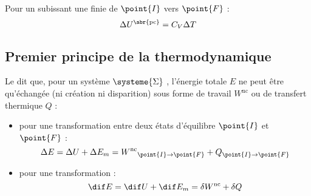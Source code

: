 \begin{propriete}
Pour un  subissant une  finie de $\point{I}$ vers $\point{F}$ :
\[\Delta U^{\text{\abr{pc}}} = C_V \Delta T\]
\end{propriete}

\subsection{Premier principe de la thermodynamique}

\begin{definition}
Le  dit que, pour un système $\systeme{\Sigma}$ , l'énergie totale $E$ ne peut être qu'échangée (ni création ni disparition) sous forme de travail $W^{\mathrm{nc}}$ ou de transfert thermique $Q$ :
\begin{itemize}
\item pour une transformation entre deux états d'équilibre $\point{I}$ et $\point{F}$ :
\[\Delta E = \Delta U + \Delta E_m = {W^{\mathrm{nc}}}_{\point{I} \to \point{F}} + Q_{\point{I} \to \point{F}}\]

\item pour une transformation  :
\[\dif E = \dif U + \dif E_m = \delta W^{\mathrm{nc}} + \delta Q\]
\end{itemize}
\end{definition}